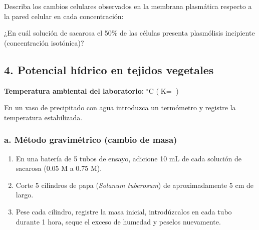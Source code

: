 \documentclass[
  spanish,
  10pt,
  letterpaper,
  twocolumn]{article}
\begin{document}
\begin{center}
\end{center}

Describa los cambios celulares observados en la membrana plasmática
respecto a la pared celular en cada concentración:

\hrulefill

\hrulefill

\hrulefill

\hrulefill

\hrulefill

\hrulefill

¿En cuál solución de sacarosa el 50\% de las células presenta
plasmólisis incipiente (concentración isotónica)?

\hrulefill

\hrulefill

\hrulefill

\hrulefill

\subsection{4. Potencial hídrico en tejidos
vegetales}\label{potencial-huxeddrico-en-tejidos-vegetales}

\textbf{Temperatura ambiental del laboratorio:}
\hrulefill \(^\circ\text{C}\) (\(\text{K} =\) \hrulefill)

En un vaso de precipitado con agua introduzca un termómetro y registre
la temperatura estabilizada.

\subsubsection{a. Método gravimétrico (cambio de
masa)}\label{a.-muxe9todo-gravimuxe9trico-cambio-de-masa}

\begin{enumerate}
\def\labelenumi{\arabic{enumi}.}
\item
  En una batería de 5 tubos de ensayo, adicione 10 mL de cada solución
  de sacarosa (0.05 M a 0.75 M).
\item
  Corte 5 cilindros de papa (\emph{Solanum tuberosum}) de
  aproximadamente 5 cm de largo.
\item
  Pese cada cilindro, registre la masa inicial, introdúzcalos en cada
  tubo durante 1 hora, seque el exceso de humedad y peselos nuevamente.
\end{enumerate}
\end{document}

